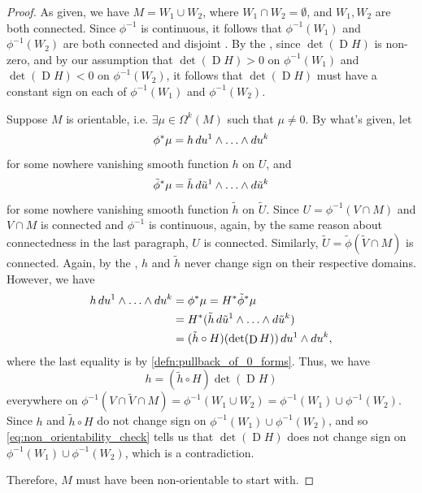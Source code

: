 \documentclass[notoc,notitlepage]{tufte-book}
\DeclareMathOperator{\D}{D}
\begin{document}
\begin{proof}
  As given, we have $M = W_1 \cup W_2$, where $W_1 \cap W_2 = \emptyset$, and
  $W_1, W_2$ are both connected. Since $\phi^{-1}$ is continuous, it follows
  that $\phi^{-1}(W_1)$ and $\phi^{-1}(W_2)$ are both connected and disjoint
  . By
  the , since $\det(\D H)$ is non-zero, and
  by our assumption that $\det(\D H) > 0$ on $\phi^{-1}(W_1)$ and $\det(\D H) <
  0$ on $\phi^{-1}(W_2)$, it follows that $\det(\D H)$ must have a constant sign
  on each of $\phi^{-1}(W_1)$ and $\phi^{-1}(W_2)$.

  Suppose $M$ is orientable, i.e. $\exists \mu \in \Omega^k(M)$ such that $\mu
  \neq 0$. By what's given, let 
  \begin{equation*}
    \phi^* \mu = h \mathop{}\!d{u^1} \land \hdots \land \mathop{}\!d{u^k}
  \end{equation*}
  for some nowhere vanishing smooth function $h$ on $U$, and
  \begin{equation*}
    \tilde{\phi}^*\mu = \tilde{h}\mathop{}\!d{\tilde{u}^1} \land \hdots \land \mathop{}\!d{\tilde{u}^k}
  \end{equation*}
  for some nowhere vanishing smooth function $\tilde{h}$ on $\tilde{U}$. Since
  $U = \phi^{-1}(V \cap M)$ and $V \cap M$ is connected and $\phi^{-1}$ is
  continuous, again, by the same reason about connectedness in the last
  paragraph, $U$ is connected. Similarly, $\tilde{U} = \tilde{\phi}(\tilde{V}
  \cap M)$ is connected. Again, by the , $h$ 
  and $\tilde{h}$ never change sign on their respective domains. However, we
  have
  \begin{align*}
    h \dif{u^1} \land \hdots \land \dif{u^k}
    &= \phi^* \mu = H^* \tilde{\phi}^* \mu \\
    &= H^*(\tilde{h} \dif{\tilde{u}^1} \land \hdots \land \dif{\tilde{u}^k}) \\
    &= (\tilde{h} \circ H)(\det (\D H)) \dif{u^1} \land \dif{u^k},
  \end{align*}
  where the last equality is by \cref{defn:pullback_of_0_forms}. Thus, we have
  \begin{equation}\label{eq:non_orientability_check}
    h = (\tilde{h} \circ H) \det(\D H)
  \end{equation}
  everywhere on $\phi^{-1}(V \cap \tilde{V} \cap M) = \phi^{-1}(W_1 \cup W_2) =
  \phi^{-1}(W_1) \cup \phi^{-1}(W_2)$. Since $h$ and $\tilde{h} \circ H$ 
   do not change sign on $\phi^{-1}(W_1) \cup \phi^{-1}(W_2)$, and so
  \cref{eq:non_orientability_check} tells us that $\det(\D H)$ does not change
  sign on $\phi^{-1}(W_1) \cup \phi^{-1}(W_2)$, which is a contradiction.

  Therefore, $M$ must have been non-orientable to start with.
\end{proof}
\end{document}
